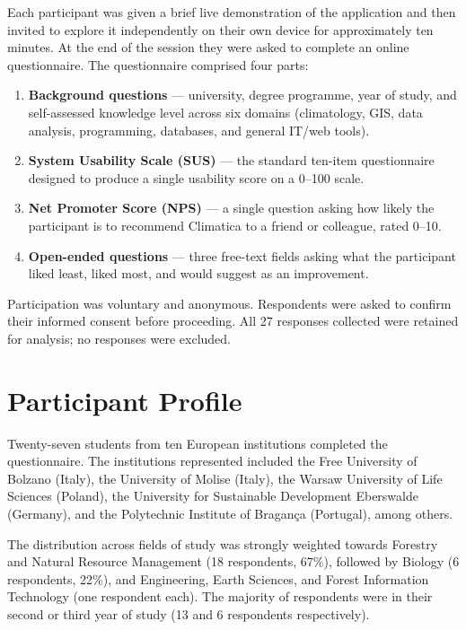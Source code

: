 Each participant was given a brief live demonstration of the application and
then invited to explore it independently on their own device for approximately
ten minutes. At the end of the session they were asked to complete an online
questionnaire. The questionnaire comprised four parts:

\begin{enumerate}
  \item \textbf{Background questions} --- university, degree programme, year
    of study, and self-assessed knowledge level across six domains (climatology,
    GIS, data analysis, programming, databases, and general IT/web tools).
  \item \textbf{System Usability Scale (SUS)} --- the standard ten-item
    questionnaire~\cite{brooke1996sus} designed to produce a single usability
    score on a 0--100 scale.
  \item \textbf{Net Promoter Score (NPS)} --- a single question asking how
    likely the participant is to recommend Climatica to a friend or colleague,
    rated 0--10.
  \item \textbf{Open-ended questions} --- three free-text fields asking what
    the participant liked least, liked most, and would suggest as an
    improvement.
\end{enumerate}

Participation was voluntary and anonymous. Respondents were asked to confirm
their informed consent before proceeding. All 27 responses collected were
retained for analysis; no responses were excluded.

\section{Participant Profile}\label{EVAL_PARTICIPANTS}

Twenty-seven students from ten European institutions completed the
questionnaire. The institutions represented included the Free University of
Bolzano (Italy), the University of Molise (Italy), the Warsaw University of
Life Sciences (Poland), the University for Sustainable Development Eberswalde
(Germany), and the Polytechnic Institute of Bragança (Portugal), among others.

The distribution across fields of study was strongly weighted towards
Forestry and Natural Resource Management (18 respondents, 67\%), followed by
Biology (6 respondents, 22\%), and Engineering, Earth Sciences, and Forest
Information Technology (one respondent each). The majority of respondents were
in their second or third year of study (13 and 6 respondents respectively).

